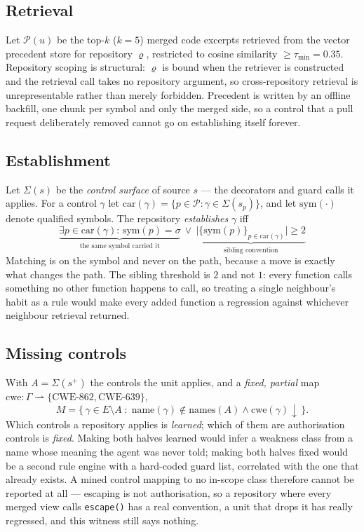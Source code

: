 \documentclass[conference]{IEEEtran}
\newcommand{\Unit}{u}
\begin{document}
\subsection{Retrieval}
Let $\mathcal{P}(\Unit)$ be the top-$k$ ($k=5$) merged code excerpts retrieved from the
vector precedent store for repository $\varrho$, restricted to cosine similarity
$\ge \tau_{\min}=0.35$. Repository scoping is structural: $\varrho$ is bound when the
retriever is constructed and the retrieval call takes no repository argument, so
cross-repository retrieval is unrepresentable rather than merely forbidden. Precedent is
written by an offline backfill, one chunk per symbol and only the merged side, so a control
that a pull request deliberately removed cannot go on establishing itself forever.

\subsection{Establishment}
Let $\Sigma(s)$ be the \emph{control surface} of source $s$ --- the decorators and guard
calls it applies. For a control $\gamma$ let
$\mathrm{car}(\gamma)=\{p \in \mathcal{P} : \gamma \in \Sigma(s_p)\}$, and let
$\mathrm{sym}(\cdot)$ denote qualified symbols. The repository \emph{establishes} $\gamma$
iff
\begin{equation}
\underbrace{\exists p \in \mathrm{car}(\gamma):\, \mathrm{sym}(p)=\sigma}_{\text{the same symbol carried it}}
\ \vee\
\underbrace{\bigl|\{\mathrm{sym}(p)\}_{p \in \mathrm{car}(\gamma)}\bigr| \ge 2}_{\text{sibling convention}}
\label{eq:est}
\end{equation}
Matching is on the symbol and never on the path, because a move is exactly what changes the
path. The sibling threshold is $2$ and not $1$: every function calls something no other
function happens to call, so treating a single neighbour's habit as a rule would make every
added function a regression against whichever neighbour retrieval returned.

\subsection{Missing controls}
With $A=\Sigma(s^{+})$ the controls the unit applies, and a \emph{fixed, partial} map
$\mathrm{cwe}: \Gamma \rightharpoonup \{\text{CWE-862}, \text{CWE-639}\}$,
\begin{equation}
M = \bigl\{\, \gamma \in E \setminus A \;:\; \mathrm{name}(\gamma) \notin \mathrm{names}(A) \wedge \mathrm{cwe}(\gamma)\!\downarrow \,\bigr\}.
\end{equation}
Which controls a repository applies is \emph{learned}; which of them are authorisation
controls is \emph{fixed}. Making both halves learned would infer a weakness class from a name
whose meaning the agent was never told; making both halves fixed would be a second rule
engine with a hard-coded guard list, correlated with the one that already exists. A mined
control mapping to no in-scope class therefore cannot be reported at all --- escaping is not
authorisation, so a repository where every merged view calls \texttt{escape()} has a real
convention, a unit that drops it has really regressed, and this witness still says nothing.
\end{document}
